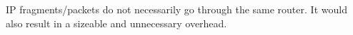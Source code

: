IP fragments/packets do not necessarily go through the same router. It would also result in a sizeable and unnecessary overhead.